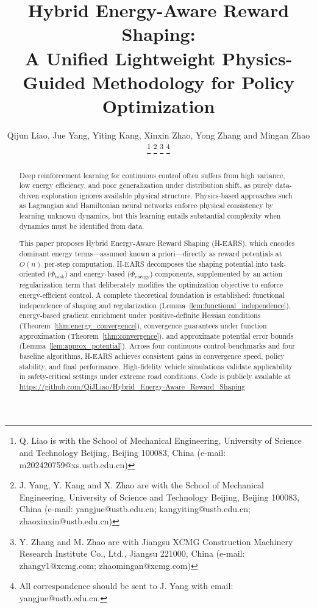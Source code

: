 \documentclass[journal]{IEEEtran}
\begin{document}
	
	\title{Hybrid Energy-Aware Reward Shaping:\\A Unified Lightweight Physics-Guided Methodology for Policy Optimization}
	
	\author{Qijun Liao,
		Jue Yang,
		Yiting Kang,
		Xinxin Zhao,
		Yong Zhang
		and Mingan Zhao
		\thanks{Q. Liao is with the School of Mechanical Engineering, University of Science and Technology Beijing, Beijing 100083, China (e-mail: m202420759@xs.ustb.edu.cn)}
		\thanks{J. Yang, Y. Kang and X. Zhao are with the School of Mechanical Engineering, University of Science and Technology Beijing, Beijing 100083, China (e-mail: yangjue@ustb.edu.cn; kangyiting@ustb.edu.cn; zhaoxinxin@ustb.edu.cn)}
		\thanks{Y. Zhang and M. Zhao are with Jiangsu XCMG Construction Machinery Research Institute Co., Ltd., Jiangsu 221000, China (e-mail: zhangy1@xcmg.com; zhaomingan@xcmg.com)}
		\thanks{All correspondence should be sent to J. Yang with email: yangjue@ustb.edu.cn.}}
	
	\maketitle
	
	\begin{abstract}
		Deep reinforcement learning for continuous control often suffers from high variance, low energy efficiency, and poor generalization under distribution shift, as purely data-driven exploration ignores available physical structure. Physics-based approaches such as Lagrangian and Hamiltonian neural networks enforce physical consistency by learning unknown dynamics, but this learning entails substantial complexity when dynamics must be identified from data.
		
		This paper proposes Hybrid Energy-Aware Reward Shaping (H-EARS), which encodes dominant energy terms---assumed known a priori---directly as reward potentials at $O(n)$ per-step computation. H-EARS decomposes the shaping potential into task-oriented ($\Phi_{\text{task}}$) and energy-based ($\Phi_{\text{energy}}$) components, supplemented by an action regularization term that deliberately modifies the optimization objective to enforce energy-efficient control. A complete theoretical foundation is established: functional independence of shaping and regularization (Lemma~\ref{lem:functional_independence}), energy-based gradient enrichment under positive-definite Hessian conditions (Theorem~\ref{thm:energy_convergence}), convergence guarantees under function approximation (Theorem~\ref{thm:convergence}), and approximate potential error bounds (Lemma~\ref{lem:approx_potential}). Across four continuous control benchmarks and four baseline algorithms, H-EARS achieves consistent gains in convergence speed, policy stability, and final performance. High-fidelity vehicle simulations validate applicability in safety-critical settings under extreme road conditions. Code is publicly available at \url{https://github.com/QiJLiao/Hybrid_Energy-Aware_Reward_Shaping}
	\end{abstract}
	
\end{document}
